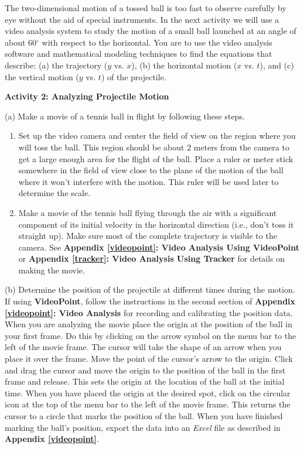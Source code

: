 The two-dimensional motion of a tossed ball is too fast to observe carefully
by eye without the aid of special instruments. In the next activity we will
use a video analysis system to study the motion of a small ball launched at
an angle of about 60\( ^{\circ } \) with respect to the horizontal. You are
to use the video analysis software and mathematical modeling techniques to find
the equations that describe: (a) the trajectory ($y$ vs. $x$), 
(b) the horizontal
motion ($x$ vs. $t$), and (c) the vertical motion ($y$ vs. 
$t$) of the projectile.

\textbf{Activity 2: Analyzing Projectile Motion} 

(a) Make a movie of a tennis ball in flight by following these steps. 

\begin{enumerate}
\item Set up the video camera and center the field of view on the region where you
will toss the ball. This region should be about 2 meters from the camera to
get a large enough area for the flight of the ball. Place a ruler or meter stick
somewhere in the field of view close to the plane of the motion of the ball
where it won't interfere with the motion. This ruler will be used later to determine
the scale. 
\item Make a movie of the tennis ball flying through the air with a significant component
of its initial velocity in the horizontal direction (i.e., don't toss it straight
up). Make sure most of the complete trajectory is visible to the camera. See
\textbf{Appendix \ref{videopoint}: Video Analysis Using VideoPoint} or \textbf{Appendix \ref{tracker}: Video Analysis Using Tracker} for details on making the movie. 

\end{enumerate}
(b) Determine the position of the projectile at different times during the 
motion. If using \textbf{VideoPoint}, follow the instructions in the second section of 
\textbf{Appendix \ref{videopoint}: Video Analysis} for recording and calibrating the position data. When you
are analyzing the movie place the origin at the position of the ball in your
first frame. Do this by clicking on the arrow symbol on the menu bar to the
left of the movie frame. The cursor will take the shape of an arrow when you
place it over the frame. Move the point of the cursor's arrow to the origin.
Click and drag the cursor and move the origin to the position of the ball in
the first frame and release. This sets the origin at the location of the ball
at the initial time. When you have placed the origin at the desired spot, click
on the circular icon at the top of the menu bar to the left of the movie frame.
This returns the cursor to a circle that marks the position of the ball.
When you have finished marking the ball's position, export the data into
an \textit{Excel} file as described in \textbf{Appendix \ref{videopoint}}.

